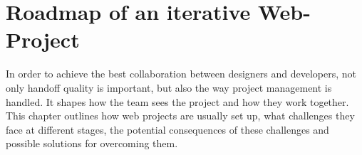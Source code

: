 \newpage
\section{Roadmap of an iterative Web-Project} %
In order to achieve the best collaboration between designers and developers, not only handoff
quality is important, but also the way project management is handled. It shapes how the team sees
the project and how they work together. This chapter outlines how web projects are usually
set up, what challenges they face at different stages, the potential consequences of these
challenges and possible solutions for overcoming them.





